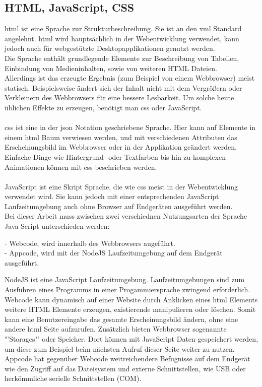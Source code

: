 \documentclass[11pt]{scrartcl}
\begin{document}
\subsection{HTML, JavaScript, CSS}
\ac{html} ist eine Sprache zur Strukturbeschreibung. Sie ist an den \ac{xml} Standard angelehnt. \ac{html}
wird hauptsächlich in der Webentwicklung verwendet, kann jedoch auch für webgestützte Desktopapplikationen
genutzt werden.\\
Die Sprache enthält grundlegende Elemente zur Beschreibung von Tabellen, Einbindung von Medieninhalten, sowie
von weiteren HTML Dateien.\\
Allerdings ist das erzeugte Ergebnis (zum Beispiel von einem Webbrowser) meist statisch. Beispielsweise ändert sich
der Inhalt nicht mit dem Vergrößern oder Verkleinern des Webbrowsers für eine bessere Lesbarkeit. Um solche heute
üblichen Effekte zu erzeugen, benötigt man \ac{css} oder JavaScript.\\
\\
\ac{css} ist eine in der \ac{json} Notation geschriebene Sprache. Hier kann auf Elemente in einem \ac{html} Baum
verwiesen werden, und mit verschiedenen Attributen das Erscheinungsbild im Webbrowser oder in der Applikation
geändert werden.\\
Einfache Dinge wie Hintergrund- oder Textfarben bis hin zu komplexen Animationen können mit \ac{css} beschrieben
werden.\\
\\
JavaScript ist eine Skript Sprache, die wie \ac{css} meist in der Webentwicklung verwendet wird. Sie kann jedoch
mit einer entsprechenden JavaScript Laufzeitumgebung auch ohne Browser auf Endgeräten ausgeführt werden.\\
Bei dieser Arbeit muss zwischen zwei verschiednen Nutzungsarten der Sprache Java-Script unterschieden werden:\\
\begin{addmargin}[2em]{0em}
 - Webcode, wird innerhalb des Webbrowsers augeführt.\\
 - Appcode, wird mit der NodeJS Laufzeitumgebung auf dem Endgerät ausgeführt.\\
\end{addmargin}
NodeJS ist eine JavaScript Laufzeitumgebung. Laufzeitumgebungen sind zum Ausführen eines Programms in einer
Progammiersprache zwingend erforderlich.\\
Webcode kann dynamisch auf einer Website durch Anklicken eines \ac{html} Elements weitere HTML Elemente erzeugen,
existierende manipulieren oder löschen. Somit kann eine Benutzereingabe das gesamte Erscheinungsbild ändern,
ohne eine andere \ac{html} Seite aufzurufen.
Zusätzlich bieten Webbrowser sogenannte "'Storages"' oder Speicher. Dort können mit JavaScript Daten gespeichert werden,
um diese zum Beispiel beim nächsten Aufruf dieser Seite weiter zu nutzen.\\
Appcode hat gegenüber Webcode weitreichendere Befugnisse auf dem Endgerät wie den Zugriff auf das Dateisystem und
externe Schnittstellen, wie USB oder herkömmliche serielle Schnittstellen (COM).
\clearpage
\end{document}
